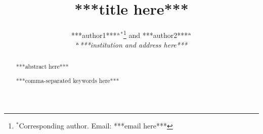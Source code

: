 \documentclass{tCTM2e}
\begin{document}



\title{***title here***}

\author{***author1***$^{\rm a}$$^{\ast}$\thanks{$^\ast$Corresponding author. Email: ***email here***
\vspace{6pt}} and ***author2***$^{\rm a}$\\\vspace{6pt}  $^{\rm a}${\em{***institution and address here***}}\\\vspace{6pt} }

\maketitle

\begin{abstract}
***abstract here***

\bigskip

\begin{keywords}
***comma-separated keywords here***
\end{keywords}\bigskip
\end{abstract}


\end{document}
